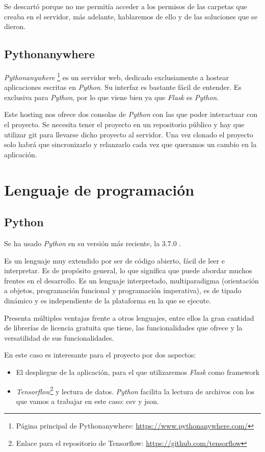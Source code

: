 Se descartó porque no me permitía acceder a los permisos de las carpetas que creaba en el servidor, más adelante, hablaremos de ello y de las soluciones que se dieron.

\subsection{Pythonanywhere}
\textit{Pythonanywhere} \footnote{Página principal de Pythonanywhere: \url{https://www.pythonanywhere.com/}} es un servidor web, dedicado exclusiamente a hostear aplicaciones escritas en \textit{Python}. Su interfaz es bastante fácil de entender. Es exclusiva para \textit{Python}, por lo que viene bien ya que \textit{Flask} es \textit{Python}.

Este hosting nos ofrece dos consolas de \textit{Python} con las que poder interactuar con el proyecto. Se necesita tener el proyecto en un repositorio público y hay que utilizar git para llevarse dicho proyecto al servidor. Una vez clonado el proyecto solo habrá que sincronizarlo y relanzarlo cada vez que queramos un cambio en la aplicación.


\section{Lenguaje de programación}
\subsection{Python}
Se ha usado \textit{Python} en su versión más reciente, la 3.7.0 \cite{python}.

Es un lenguaje muy extendido por ser de código abierto, fácil de leer e interpretar.
Es de propósito general, lo que significa que puede abordar muchos frentes en el desarrollo. Es un lenguaje interpretado, multiparadigma (orientación a objetos, programación funcional y programación imperativa), es de tipado dinámico y es independiente de la plataforma en la que se ejecute.

Presenta múltiples ventajas frente a otros lenguajes, entre ellos la gran cantidad de librerías de licencia gratuita que tiene, las funcionalidades que ofrece y la versatilidad de sus funcionalidades.

En este caso es interesante para el proyecto por dos aspectos: 
\begin{itemize}
	\item El despliegue de la aplicación, para el que utilizaremos \textit{Flask} como framework 
	\item \textit{Tensorflow}\footnote{Enlace para el repositorio de Tensorflow: \url{https://github.com/tensorflow}} y lectura de datos. \textit{Python} facilita la lectura de archivos con los que vamos a trabajar en este caso: csv y json.
\end{itemize}
